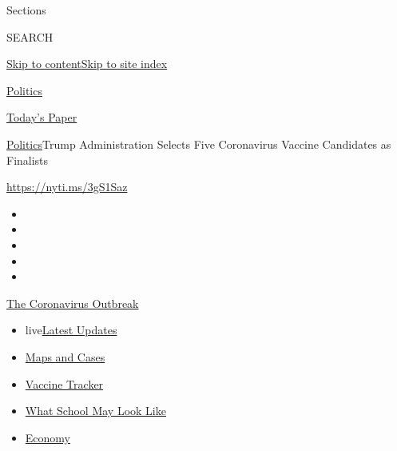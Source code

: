 Sections

SEARCH

\protect\hyperlink{site-content}{Skip to
content}\protect\hyperlink{site-index}{Skip to site index}

\href{https://www.nytimes.com/section/politics}{Politics}

\href{https://myaccount.nytimes.com/auth/login?response_type=cookie\&client_id=vi}{}

\href{https://www.nytimes.com/section/todayspaper}{Today's Paper}

\href{/section/politics}{Politics}\textbar{}Trump Administration Selects
Five Coronavirus Vaccine Candidates as Finalists

\url{https://nyti.ms/3gS1Saz}

\begin{itemize}
\item
\item
\item
\item
\item
\end{itemize}

\href{https://www.nytimes.com/news-event/coronavirus?action=click\&pgtype=Article\&state=default\&region=TOP_BANNER\&context=storylines_menu}{The
Coronavirus Outbreak}

\begin{itemize}
\tightlist
\item
  live\href{https://www.nytimes.com/2020/08/02/world/coronavirus-updates.html?action=click\&pgtype=Article\&state=default\&region=TOP_BANNER\&context=storylines_menu}{Latest
  Updates}
\item
  \href{https://www.nytimes.com/interactive/2020/us/coronavirus-us-cases.html?action=click\&pgtype=Article\&state=default\&region=TOP_BANNER\&context=storylines_menu}{Maps
  and Cases}
\item
  \href{https://www.nytimes.com/interactive/2020/science/coronavirus-vaccine-tracker.html?action=click\&pgtype=Article\&state=default\&region=TOP_BANNER\&context=storylines_menu}{Vaccine
  Tracker}
\item
  \href{https://www.nytimes.com/interactive/2020/07/29/us/schools-reopening-coronavirus.html?action=click\&pgtype=Article\&state=default\&region=TOP_BANNER\&context=storylines_menu}{What
  School May Look Like}
\item
  \href{https://www.nytimes.com/live/2020/07/31/business/stock-market-today-coronavirus?action=click\&pgtype=Article\&state=default\&region=TOP_BANNER\&context=storylines_menu}{Economy}
\end{itemize}


